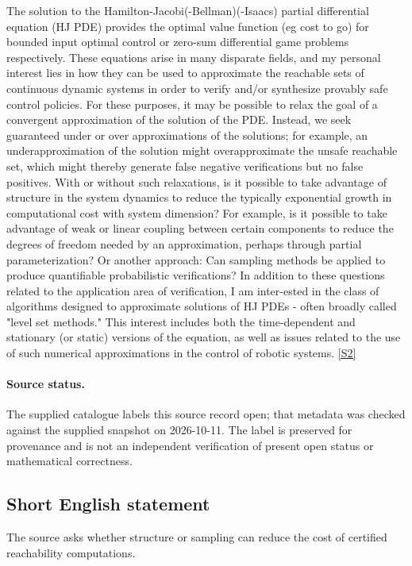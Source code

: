 \documentclass[11pt]{article}
\newcommand{\sref}[2]{\hyperlink{source:#1:#2}{[S#2]}}
\begin{document}
The solution to the Hamilton-Jacobi(-Bellman)(-Isaacs) partial differential equation (HJ PDE) provides the optimal value function (eg cost to go) for bounded input optimal control or zero-sum differential game problems respectively. These equations arise in many disparate fields, and my personal interest lies in how they can be used to approximate the reachable sets of continuous dynamic systems in order to verify and/or synthesize provably safe control policies. For these purposes, it may be possible to relax the goal of a convergent approximation of the solution of the PDE. Instead, we seek guaranteed under or over approximations of the solutions; for example, an underapproximation of the solution might overapproximate the unsafe reachable set, which might thereby generate false negative verifications but no false positives. With or without such relaxations, is it possible to take advantage of structure in the system dynamics to reduce the typically exponential growth in computational cost with system dimension? For example, is it possible to take advantage of weak or linear coupling between certain components to reduce the degrees of freedom needed by an approximation, perhaps through partial parameterization? Or another approach: Can sampling methods be applied to produce quantifiable probabilistic verifications? In addition to these questions related to the application area of verification, I am inter-ested in the class of algorithms designed to approximate solutions of HJ PDEs - often broadly called "level set methods." This interest includes both the time-dependent and stationary (or static) versions of the equation, as well as issues related to the use of such numerical approximations in the control of robotic systems. \sref{20001172}{2}
\paragraph{Source status.}
The supplied catalogue labels this source record open; that metadata was checked against the supplied snapshot on 2026-10-11. The label is preserved for provenance and is not an independent verification of present open status or mathematical correctness.
\subsection{Short English statement}
The source asks whether structure or sampling can reduce the cost of certified reachability computations.
\end{document}
